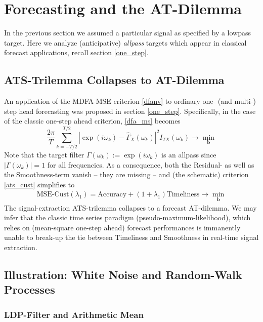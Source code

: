 \documentclass[a4paper]{book}
\begin{document}
\section{Forecasting and the AT-Dilemma}\label{fatatd}

In the previous section we assumed a particular signal as specified by a lowpass target. Here we analyze (anticipative) \emph{allpass} targets which appear in classical forecast applications, recall section \ref{one_step}.    

\subsection{ATS-Trilemma Collapses to AT-Dilemma}

An application of the MDFA-MSE criterion \ref{dfanv} to ordinary one- (and multi-) step head forecasting was proposed in section \ref{one_step}. Specifically, in the case of the classic one-step ahead criterion, \ref{dfa_ms} becomes 
\begin{equation}\label{dfanv_1s_ats}
\frac{2\pi}{T} \sum_{k=-T/2}^{T/2}
\left|\exp(i\omega_k)-\hat{\Gamma}_X(\omega_k)\right|^2I_{T
X}(\omega_k) \to \min_{\mathbf{b}}
\end{equation}
Note that the target filter $\Gamma(\omega_k):=\exp(i\omega_k)$ is an allpass since $|\Gamma(\omega_k)|=1$ for all frequencies. As a consequence, both the Residual- as well as the Smoothness-term vanish -- they are missing -- and (the schematic) criterion  \ref{ats_cust} simplifies to
\begin{eqnarray*}
\textrm{MSE-Cust}(\lambda_1)=\textrm{Accuracy}+(1+\lambda_1) \textrm{Timeliness}\to \min_{\mathbf{b}}
\end{eqnarray*}
The signal-extraction ATS-trilemma collapses to a forecast {AT-dilemma}. We may infer that the classic time series paradigm (pseudo-maximum-likelihood), which relies on (mean-square one-step ahead) forecast performances is immanently unable to break-up the tie between Timeliness and Smoothness in real-time signal extraction.  




\subsection{Illustration: White Noise and Random-Walk Processes}\label{i_w_rw}

\subsubsection{LDP-Filter and Arithmetic Mean}
\end{document}
